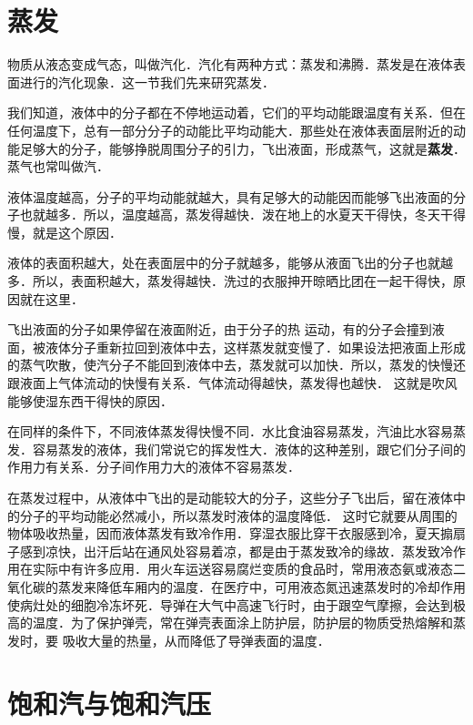 \section{蒸发}
物质从液态变成气态，叫做汽化．汽化有两种方式：蒸发和沸腾．蒸发是在液体表面进行的汽化现象．这一节我们先来研究蒸发．

我们知道，液体中的分子都在不停地运动着，它们的平均动能跟温度有关系．但在任何温度下，总有一部分分子的动能比平均动能大．那些处在液体表面层附近的动能足够大的分子，能够挣脱周围分子的引力，飞出液面，形成蒸气，这就是\textbf{蒸发}．
蒸气也常叫做汽．

液体温度越高，分子的平均动能就越大，具有足够大的动能因而能够飞出液面的分子也就越多．所以，温度越高，蒸发得越快．泼在地上的水夏天干得快，冬天干得慢，就是这个原因．

液体的表面积越大，处在表面层中的分子就越多，能够从液面飞出的分子也就越多．所以，表面积越大，蒸发得越快．洗过的衣服抻开晾晒比团在一起干得快，原因就在这里．

飞出液面的分子如果停留在液面附近，由于分子的热
运动，有的分子会撞到液面，被液体分子重新拉回到液体中去，这样蒸发就变慢了．如果设法把液面上形成的蒸气吹散，使汽分子不能回到液体中去，蒸发就可以加快．所以，蒸发的快慢还跟液面上气体流动的快慢有关系．气体流动得越快，蒸发得也越快．
这就是吹风能够使湿东西干得快的原因．

在同样的条件下，不同液体蒸发得快慢不同．水比食油容易蒸发，汽油比水容易蒸发．容易蒸发的液体，我们常说它的挥发性大．液体的这种差别，跟它们分子间的作用力有关系．分子间作用力大的液体不容易蒸发．

在蒸发过程中，从液体中飞出的是动能较大的分子，这些分子飞出后，留在液体中的分子的平均动能必然减小，所以蒸发时液体的温度降低．
这时它就要从周围的物体吸收热量，因而液体蒸发有致冷作用．穿湿衣服比穿干衣服感到冷，夏天搧扇子感到凉快，出汗后站在通风处容易着凉，都是由于蒸发致冷的缘故．蒸发致冷作用在实际中有许多应用．用火车运送容易腐烂变质的食品时，常用液态氨或液态二氧化碳的蒸发来降低车厢内的温度．在医疗中，可用液态氮迅速蒸发时的冷却作用使病灶处的细胞冷冻坏死．导弹在大气中高速飞行时，由于跟空气摩擦，会达到极高的温度．为了保护弹壳，常在弹壳表面涂上防护层，防护层的物质受热熔解和蒸发时，要
吸收大量的热量，从而降低了导弹表面的温度．

\section{饱和汽与饱和汽压}

